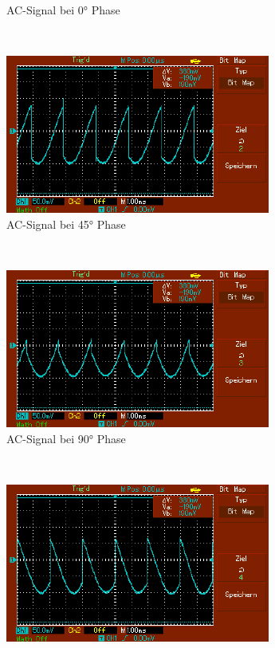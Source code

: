 \documentclass[captions=tableheading]{scrartcl}
\begin{document}
\begin{itemize}
\begin{figure}
                \caption{AC-Signal bei 0° Phase}
                \label{fig:0sig2}
            \end{figure}
            \\
            \begin{figure}
                \centering
                \includegraphics{Lock_In Bilder/Aufgabe 3/MAP002.pdf}
                \caption{AC-Signal bei 45° Phase}
                \label{fig:45sig2}
            \end{figure}
            \\
            \begin{figure}
                \centering
                \includegraphics{Lock_In Bilder/Aufgabe 3/MAP003.pdf}
                \caption{AC-Signal bei 90° Phase}
                \label{fig:90sig2}
            \end{figure}
            \\
            \newpage
            \begin{figure}
                \centering
                \includegraphics{Lock_In Bilder/Aufgabe 3/MAP004.pdf}

\end{figure}
\end{itemize}
\end{document}
